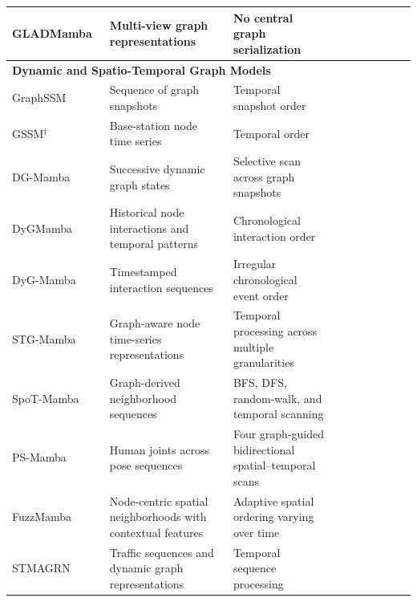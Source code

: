 \documentclass[acmsmall]{acmart}
\newcommand{\cmark}{\ding{51}}
\begin{document}
\begin{table}[h]
{\begin{tabular}{@{}
p{2.2cm}
p{3.6cm}
p{3.6cm}
ccc
cccc
@{}}
GLADMamba~\cite{fu2025gladmamba} &
Multi-view graph representations &
No central graph serialization &
& \cmark & &
& & \cmark & \\


\midrule
\multicolumn{10}{l}{\textbf{Dynamic and Spatio-Temporal Graph Models}} \\
\midrule

GraphSSM~\cite{li2024state} &
Sequence of graph snapshots &
Temporal snapshot order &
& & \cmark &
\cmark & & & \\

GSSM$^\dagger$~\cite{zhou2024graph} &
Base-station node time series &
Temporal order &
& \cmark & &
& \cmark & & \\

DG-Mamba~\cite{yuan2025dg} &
Successive dynamic graph states &
Selective scan across graph snapshots &
& \cmark & &
& & \cmark & \\

DyGMamba~\cite{ding2024dygmamba} &
Historical node interactions and temporal patterns &
Chronological interaction order &
\cmark & & &
\cmark & & & \\

DyG-Mamba~\cite{li2024dyg} &
Timestamped interaction sequences &
Irregular chronological event order &
& \cmark & &
\cmark & & & \\

STG-Mamba~\cite{li2024stg} &
Graph-aware node time-series representations &
Temporal processing across multiple granularities &
& \cmark & &
& &  &\cmark \\

SpoT-Mamba~\cite{choi2024spot} &
Graph-derived neighborhood sequences &
BFS, DFS, random-walk, and temporal scanning &
\cmark & & &
\cmark & & & \\

PS-Mamba~\cite{dong2025ps} &
Human joints across pose sequences &
Four graph-guided bidirectional spatial--temporal scans &
\cmark & & &
& & \cmark & \\

FuzzMamba~\cite{chen2026modeling} &
Node-centric spatial neighborhoods with contextual features &
Adaptive spatial ordering varying over time &
& \cmark & &
\cmark & & & \\

STMAGRN~\cite{zhang2025spatio} &
Traffic sequences and dynamic graph representations &
Temporal sequence processing &
\cmark & & &
& \cmark & & \\



\end{tabular}}
\end{table}
\end{document}
